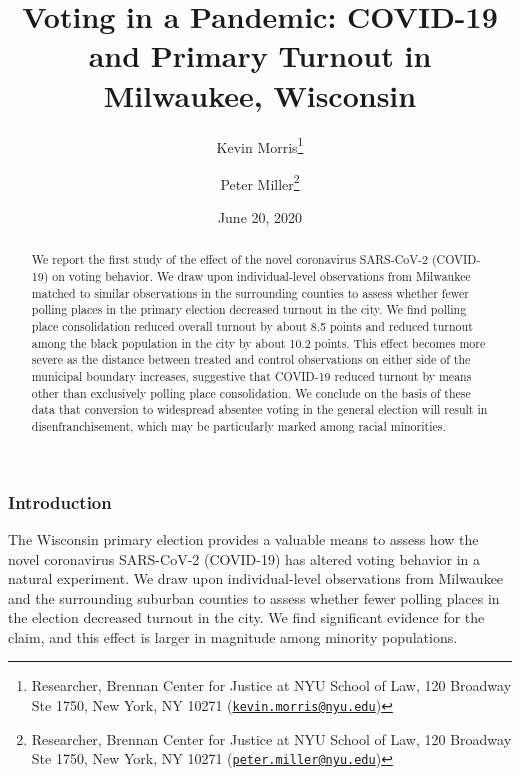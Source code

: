 \documentclass[
  12pt,
]{article}
\title{Voting in a Pandemic: COVID-19 and Primary Turnout in Milwaukee, Wisconsin}
\author{Kevin Morris\footnote{Researcher, Brennan Center for Justice at NYU School of Law, 120 Broadway Ste 1750, New York, NY 10271 (\href{mailto:kevin.morris@nyu.edu}{\nolinkurl{kevin.morris@nyu.edu}})} \and Peter Miller\footnote{Researcher, Brennan Center for Justice at NYU School of Law, 120 Broadway Ste 1750, New York, NY 10271 (\href{mailto:peter.miller@nyu.edu}{\nolinkurl{peter.miller@nyu.edu}})}}
\date{June 20, 2020}
\begin{document}
\maketitle
\begin{abstract}
We report the first study of the effect of the novel coronavirus SARS-CoV-2 (COVID-19) on voting behavior. We draw upon individual-level observations from Milwaukee matched to similar observations in the surrounding counties to assess whether fewer polling places in the primary election decreased turnout in the city. We find polling place consolidation reduced overall turnout by about 8.5 points and reduced turnout among the black population in the city by about 10.2 points. This effect becomes more severe as the distance between treated and control observations on either side of the municipal boundary increases, suggestive that COVID-19 reduced turnout by means other than exclusively polling place consolidation. We conclude on the basis of these data that conversion to widespread absentee voting in the general election will result in disenfranchisement, which may be particularly marked among racial minorities.
\end{abstract}

\pagebreak

\doublespacing

\hypertarget{introduction}{%
\subsubsection*{Introduction}\label{introduction}}

The Wisconsin primary election provides a valuable means to assess how the novel coronavirus SARS-CoV-2 (COVID-19) has altered voting behavior in a natural experiment. We draw upon individual-level observations from Milwaukee and the surrounding suburban counties to assess whether fewer polling places in the election decreased turnout in the city. We find significant evidence for the claim, and this effect is larger in magnitude among minority populations.
\end{document}

